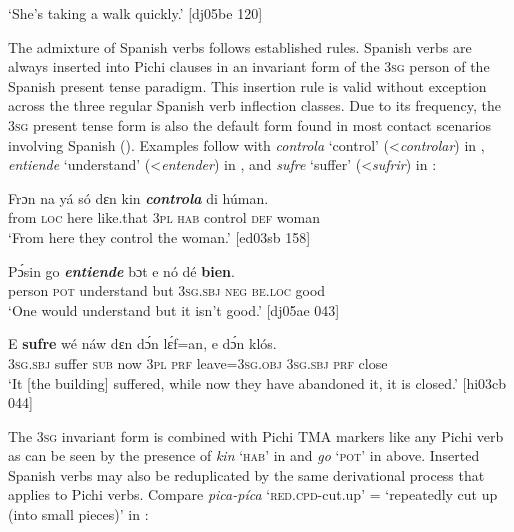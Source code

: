 \glt ‘She’s taking a walk quickly.’ [dj05be 120]
\z

The admixture of Spanish verbs follows established rules. Spanish verbs are always inserted into Pichi clauses in an invariant form of the \textsc{3sg} person of the Spanish present tense paradigm. This insertion rule is valid without exception across the three regular Spanish verb inflection classes. Due to its frequency, the \textsc{3sg} present tense form is also the default form found in most contact scenarios involving Spanish (\citealt[20–21]{Clements2009}). Examples follow with \textit{controla} ‘control’ (<\textit{controlar}) in , \textit{entiende} ‘understand’ (<\textit{entender}) in , and \textit{sufre} ‘suffer’ (<\textit{sufrir}) in :


\ea%
    \label{ex:key:1709}
    \gll Frɔn    na  yá    só    dɛn  kin  \textbf{\textit{controla}}  di  húman.\\
from  \textsc{loc}  here    like.that  \textsc{3pl}  \textsc{hab}  control  \textsc{def}  woman\\

\glt ‘From here they control the woman.’ [ed03sb 158]
\z


\ea%
    \label{ex:key:1710}
    \gll Pɔ́sin  go   \textbf{\textit{entiende}}    bɔt  e    nó  dé    \textbf{bien}.\\
person  \textsc{pot}  understand  but  \textsc{3sg.sbj}  \textsc{neg}  \textsc{be.loc}  good\\

\glt ‘One would understand but it isn’t good.’ [dj05ae 043]
\z


\ea%
    \label{ex:key:1711}
    \gll E    \textbf{sufre}  wé  náw  dɛn  dɔ́n  lɛ́f=an,    e    dɔ́n  klós.\\
\textsc{3sg.sbj}  suffer  \textsc{sub}  now  \textsc{3pl}  \textsc{prf}  leave=\textsc{3sg.obj}  \textsc{3sg.sbj}  \textsc{prf}  close\\

\glt ‘It [the building] suffered, while now they have abandoned it, it is closed.’ [hi03cb 044]
\z

The \textsc{3sg} invariant form is combined with Pichi TMA markers like any Pichi verb as can be seen by the presence of \textit{kin} ‘\textsc{hab}’ in  and \textit{go} ‘\textsc{pot}’ in  above. Inserted Spanish verbs may also be reduplicated by the same derivational process that applies to Pichi verbs. Compare \textit{pica-píca} ‘\textsc{red}.\textsc{cpd}{}-cut.up’ = ‘repeatedly cut up (into small pieces)’ in : 



